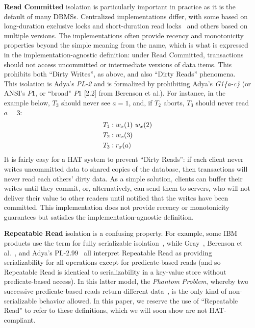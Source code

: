 \textbf{Read Committed} isolation is particularly important in
practice as it is the default of many DBMSs. Centralized
implementations differ, with some based on long-duration exclusive
locks and short-duration read locks~\cite{gray-isolation} and others
based on multiple versions. The implementations often provide recency
and monotonicity properties beyond the simple meaning from the name,
which is what is expressed in the implementation-agnostic definition:
under Read Committed, transactions should not access uncommitted or
intermediate versions of data items. This prohibits both ``Dirty
Writes'', as above, and also ``Dirty Reads'' phenomena.  This
isolation is Adya's \textit{PL-2} and is formalized by prohibiting
Adya's \textit{G1\{a-c\}} (or ANSI's $P1$, or ``broad'' $P1$ [2.2]
from Berenson et al.). For instance, in the example below, $T_3$
should never see $a=1$, and, if $T_2$ aborts, $T_3$ should never read
$a=3$:
\begin{align*}
\small\vspace{-.5em}
T_1 &: w_x(1)~w_x(2)
\\T_2 &: w_x(3)\\
T_3 &: r_x(a)\vspace{-.5em}
\end{align*}
It is fairly easy for a HAT system to prevent ``Dirty Reads'': if each
client never writes uncommitted data to shared copies of the database, then
transactions will never read each others' dirty data. As a simple
solution, clients can buffer their writes until they commit, or,
alternatively, can send them to servers, who will not deliver their
value to other readers until notified that the writes have been
committed. This implementation does not provide recency or
monotonicity guarantees but satisfies the implementation-agnostic
definition.

\textbf{Repeatable Read} isolation is a confusing property. For example,
some IBM products use the term for fully serializable
isolation~\cite{hat-hotos}, while Gray~\cite{gray-isolation}, Berenson
et al.~\cite{ansicritique}, and Adya's PL-2.99~\cite{adya} all
interpret Repeatable Read as providing serializability for all
operations except for predicate-based reads (and so Repeatable Read is
identical to serializability in a key-value store without
predicate-based access). In this latter model, the \textit{Phantom
  Problem}, whereby two successive predicate-based reads return
different data~\cite{gray-isolation}, is the only kind of
non-serializable behavior allowed. In this paper, we reserve the use
of ``Repeatable Read'' to refer to these definitions, which we will
soon show are not HAT-compliant.

